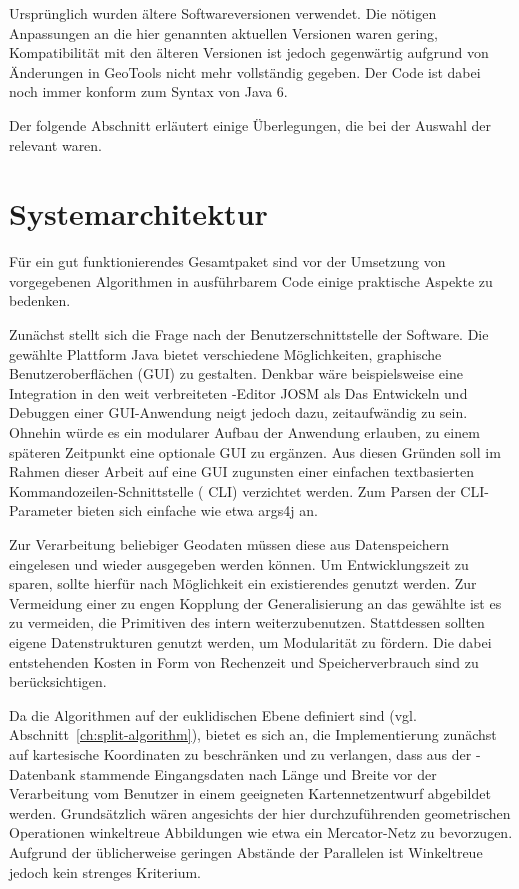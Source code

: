\documentclass[../main/thesis.tex]{subfiles}
\begin{document}
Ursprünglich wurden ältere Softwareversionen verwendet.
Die nötigen Anpassungen an die hier genannten aktuellen Versionen waren gering, Kompatibilität mit den älteren Versionen ist jedoch gegenwärtig aufgrund von Änderungen in GeoTools nicht mehr vollständig gegeben.
Der Code ist dabei noch immer konform zum Syntax von Java 6. 

Der folgende Abschnitt erläutert einige Überlegungen, die bei der Auswahl der  relevant waren.



\section{Systemarchitektur}

Für ein gut funktionierendes Gesamtpaket sind vor der Umsetzung von vorgegebenen Algorithmen in ausführbarem Code einige praktische Aspekte zu bedenken.

Zunächst stellt sich die Frage nach der Benutzerschnittstelle der Software.
Die gewählte Plattform Java bietet verschiedene Möglichkeiten, graphische Benutzeroberflächen (GUI) zu gestalten.
Denkbar wäre beispielsweise eine Integration in den weit verbreiteten \osm-Editor JOSM als 
Das Entwickeln und Debuggen einer GUI-Anwendung neigt jedoch dazu, zeitaufwändig zu sein.
Ohnehin würde es ein modularer Aufbau der Anwendung erlauben, zu einem späteren Zeitpunkt eine optionale GUI zu ergänzen.
Aus diesen Gründen soll im Rahmen dieser Arbeit auf eine GUI zugunsten einer einfachen textbasierten Kommandozeilen-Schnittstelle ( CLI) verzichtet werden.
Zum Parsen der CLI-Parameter bieten sich einfache  wie etwa args4j an.

Zur Verarbeitung beliebiger Geodaten müssen diese aus Datenspeichern eingelesen und wieder ausgegeben werden können.
Um Entwicklungszeit zu sparen, sollte hierfür nach Möglichkeit ein existierendes  genutzt werden.
Zur Vermeidung einer zu engen Kopplung der Generalisierung an das gewählte  ist es zu vermeiden, die Primitiven des  intern weiterzubenutzen.
Stattdessen sollten eigene Datenstrukturen genutzt werden, um Modularität zu fördern.
Die dabei entstehenden Kosten in Form von Rechenzeit und Speicherverbrauch sind zu berücksichtigen.

Da die Algorithmen auf der euklidischen Ebene definiert sind (vgl. Abschnitt~\ref{ch:split-algorithm}), bietet es sich an, die Implementierung zunächst auf kartesische Koordinaten zu beschränken und zu verlangen, dass aus der \osm-Datenbank stammende Eingangsdaten nach Länge und Breite vor der Verarbeitung vom Benutzer in einem geeigneten Kartennetzentwurf abgebildet werden.
Grundsätzlich wären angesichts der hier durchzuführenden geometrischen Operationen winkeltreue Abbildungen wie etwa ein Mercator-Netz zu bevorzugen.
Aufgrund der üblicherweise geringen Abstände der Parallelen ist Winkeltreue jedoch kein strenges Kriterium.
\end{document}
